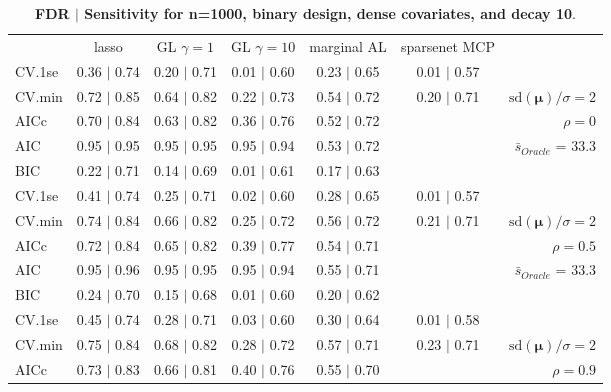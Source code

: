 \clearpage
\begin{table}\vspace{-.5cm}
\caption[l]{ {\it }
{ \bf FDR $\boldsymbol{\mid}$ Sensitivity for n=1000, binary design, dense covariates, and  decay  10}.}
\vspace{-.5cm}
\footnotesize{}
\begin{center}
\begin{tabular}{l*{5}{c}|r}
 & lasso & GL $\gamma=1$ & GL $\gamma=10$ & marginal AL & sparsenet MCP  & \\
 \cline{1-7}
CV.1se & 0.36 $\mid$ 0.74 & 0.20 $\mid$ 0.71 & 0.01 $\mid$ 0.60 & 0.23 $\mid$ 0.65 & 0.01 $\mid$ 0.57 & \\
CV.min & 0.72 $\mid$ 0.85 & 0.64 $\mid$ 0.82 & 0.22 $\mid$ 0.73 & 0.54 $\mid$ 0.72 & 0.20 $\mid$ 0.71 &  $\mathrm{sd}(\mathbf{\mu})/\sigma=2$ \\
AICc & 0.70 $\mid$ 0.84 & 0.63 $\mid$ 0.82 & 0.36 $\mid$ 0.76 & 0.52 $\mid$ 0.72 & & $\rho=0$ \\
AIC & 0.95 $\mid$ 0.95 & 0.95 $\mid$ 0.95 & 0.95 $\mid$ 0.94 & 0.53 $\mid$ 0.72 & &  \multirow{2}{*}{$\bar{s}_{Oracle}$ = 33.3} \\
BIC & 0.22 $\mid$ 0.71 & 0.14 $\mid$ 0.69 & 0.01 $\mid$ 0.61 & 0.17 $\mid$ 0.63 & &  \\
 \hline 
CV.1se & 0.41 $\mid$ 0.74 & 0.25 $\mid$ 0.71 & 0.02 $\mid$ 0.60 & 0.28 $\mid$ 0.65 & 0.01 $\mid$ 0.57 & \\
CV.min & 0.74 $\mid$ 0.84 & 0.66 $\mid$ 0.82 & 0.25 $\mid$ 0.72 & 0.56 $\mid$ 0.72 & 0.21 $\mid$ 0.71 &  $\mathrm{sd}(\mathbf{\mu})/\sigma=2$ \\
AICc & 0.72 $\mid$ 0.84 & 0.65 $\mid$ 0.82 & 0.39 $\mid$ 0.77 & 0.54 $\mid$ 0.71 & & $\rho=0.5$ \\
AIC & 0.95 $\mid$ 0.96 & 0.95 $\mid$ 0.95 & 0.95 $\mid$ 0.94 & 0.55 $\mid$ 0.71 & &  \multirow{2}{*}{$\bar{s}_{Oracle}$ = 33.3} \\
BIC & 0.24 $\mid$ 0.70 & 0.15 $\mid$ 0.68 & 0.01 $\mid$ 0.60 & 0.20 $\mid$ 0.62 & &  \\
 \hline 
CV.1se & 0.45 $\mid$ 0.74 & 0.28 $\mid$ 0.71 & 0.03 $\mid$ 0.60 & 0.30 $\mid$ 0.64 & 0.01 $\mid$ 0.58 & \\
CV.min & 0.75 $\mid$ 0.84 & 0.68 $\mid$ 0.82 & 0.28 $\mid$ 0.72 & 0.57 $\mid$ 0.71 & 0.23 $\mid$ 0.71 &  $\mathrm{sd}(\mathbf{\mu})/\sigma=2$ \\
AICc & 0.73 $\mid$ 0.83 & 0.66 $\mid$ 0.81 & 0.40 $\mid$ 0.76 & 0.55 $\mid$ 0.70 & & $\rho=0.9$ \\

\end{tabular}
\end{center}
\end{table}
